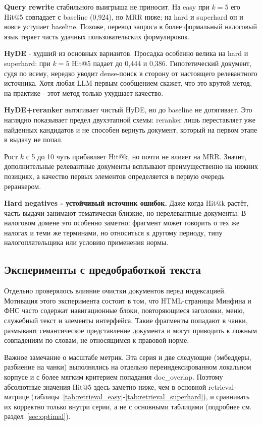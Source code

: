 \documentclass[a4paper,12pt]{article}
\begin{document}
\textbf{Query rewrite} стабильного выигрыша не приносит. На easy при $k=5$ его Hit@5 совпадает с baseline (0,924), но MRR ниже; на hard и superhard он и вовсе уступает baseline. Похоже, перевод запроса в более формальный налоговый язык теряет часть удачных пользовательских формулировок.

\textbf{HyDE} - худший из основных вариантов. Просадка особенно велика на hard и superhard: при $k=5$ Hit@5 падает до 0,444 и 0,386. Гипотетический документ, судя по всему, нередко уводит dense-поиск в сторону от настоящего релевантного источника. Хотя любая LLM первым сообщением скажет, что это крутой метод, на практике - этот метод только ухудшает качество.

\textbf{HyDE+reranker} вытягивает чистый HyDE, но до baseline не дотягивает. Это наглядно показывает предел двухэтапной схемы: reranker лишь переставляет уже найденных кандидатов и не способен вернуть документ, который на первом этапе в выдачу не попал.

Рост $k$ с 5 до 10 чуть прибавляет Hit@k, но почти не влияет на MRR. Значит, дополнительные релевантные документы всплывают преимущественно на нижних позициях, а качество первых элементов определяется в первую очередь реранкером.

\textbf{Hard negatives - устойчивый источник ошибок.} Даже когда Hit@k растёт, часть выдачи занимают тематически близкие, но нерелевантные документы. В налоговом домене это особенно заметно: фрагмент может говорить о тех же налогах и теми же терминами, но относиться к другому периоду, типу налогоплательщика или условию применения нормы.

\subsection{Эксперименты с предобработкой текста}

Отдельно проверялось влияние очистки документов перед индексацией. Мотивация этого эксперимента состоит в том, что HTML-страницы Минфина и ФНС часто содержат навигационные блоки, повторяющиеся заголовки, меню, служебный текст и элементы интерфейса. Такие фрагменты попадают в чанки, размывают семантическое представление документа и могут приводить к ложным совпадениям по словам, не относящимся к правовой норме.

Важное замечание о масштабе метрик. Эта серия и две следующие (эмбеддеры, разбиение на чанки) выполнялись на отдельно переиндексированном локальном корпусе и с более мягким критерием попадания doc\_overlap. Поэтому абсолютные значения Hit@5 здесь заметно ниже, чем в основной retrieval-матрице (таблицы~\ref{tab:retrieval_easy}-\ref{tab:retrieval_superhard}), и сравнивать их корректно только внутри серии, а не с основными таблицами (подробнее см. раздел~\ref{sec:optimal}).
\end{document}
